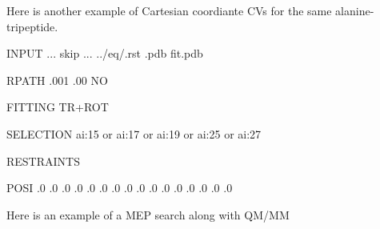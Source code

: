 \documentclass[a4paper,11pt,oneside,english]{sphinxmanual}
\begin{document}
Here is another example of Cartesian coordiante CVs for the same
alanine-tripeptide.

\begin{sphinxVerbatim}[commandchars=\\\{\}]
\PYG{o}{[}INPUT\PYG{o}{]}
... skip ...
  ../eq/.rst
  .pdb
  fit.pdb

\PYG{o}{[}RPATH\PYG{o}{]}
           
       
              .001
             .00
      
       NO

\PYG{o}{[}FITTING\PYG{o}{]}
  TR+ROT
    

\PYG{o}{[}SELECTION\PYG{o}{]}
         ai:15 or ai:17 or ai:19 or ai:25 or ai:27

\PYG{o}{[}RESTRAINTS\PYG{o}{]}
     

      POSI
      .0 .0 .0 .0 
                .0 .0 .0 .0 
                .0 .0 .0 .0 
                .0 .0 .0 .0
  
\end{sphinxVerbatim}

Here is an example of a MEP search along with QM/MM
\end{document}
